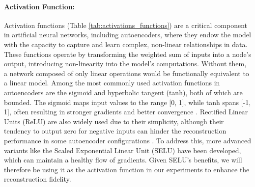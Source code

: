 \paragraph{Activation Function:} Activation functions (Table \ref{tab:activations_functions}) are a critical component in artificial neural networks, including autoencoders, where they endow the model with the capacity to capture and learn complex, non-linear relationships in data. These functions operate by transforming the weighted sum of inputs into a node’s output, introducing non-linearity into the model’s computations. Without them, a network composed of only linear operations would be functionally equivalent to a linear model. Among the most commonly used activation functions in autoencoders are the sigmoid and hyperbolic tangent (tanh), both of which are bounded. The sigmoid maps input values to the range [0, 1], while tanh spans [-1, 1], often resulting in stronger gradients and better convergence \cite{Berahmand24}. Rectified Linear Units (ReLU) \cite{ReLU} are also widely used due to their simplicity, although their tendency to output zero for negative inputs can hinder the reconstruction performance in some autoencoder configurations \cite{Charte18}. To address this, more advanced variants like the Scaled Exponential Linear Unit (SELU) \cite{SELU} have been developed, which can maintain a healthy flow of gradients. Given SELU’s benefits, we will therefore be using it as the activation function in our experiments to enhance the reconstruction fidelity.

